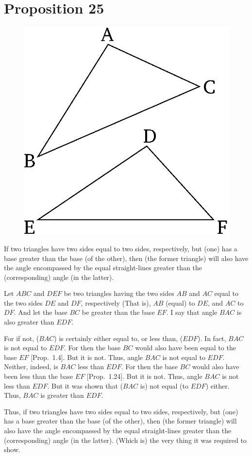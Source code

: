 \chapter*{Proposition 25}



\begin{figure}[ht]
    \begin{center}
    \includegraphics[width=0.5\linewidth]{figures/fig25e.eps}
    \label{fig:prop_25}
    \end{center}
\end{figure}

If two triangles have two sides equal to two sides, respectively,
but (one) has a base greater than the base (of the other), then (the former triangle) will also have the angle encompassed by the equal straight-lines greater than the (corresponding) angle (in the latter).

Let $ABC$ and $DEF$ be  two triangles having the two sides $AB$ and $AC$
equal to the two sides $DE$ and $DF$, respectively (That is), $AB$ (equal) to $DE$, and $AC$ to $DF$. And let the base $BC$ be greater than the base $EF$. I say that angle
$BAC$ is also greater than $EDF$.

For if not, ($BAC$) is certainly either equal to, or less than, ($EDF$). In fact, $BAC$ is not equal to
$EDF$. For then the base $BC$ would also have been equal to the base $EF$ [Prop.~1.4]. But it is not.
Thus, angle $BAC$ is not equal to $EDF$. Neither, indeed, is $BAC$ less
than $EDF$. For then the base $BC$ would also have been less than the base $EF$ [Prop.~1.24].
But it is not. Thus, angle $BAC$ is not less than $EDF$. But it was  shown
that ($BAC$ is) not equal (to $EDF$) either. Thus, $BAC$ is greater than $EDF$.

Thus, if two triangles have two sides equal to two sides, respectively,
but (one) has a base greater than the base (of the other), then (the former triangle) will also have the angle encompassed by the equal straight-lines greater than the (corresponding) angle (in the latter). (Which is) the
very thing it was required to show.


